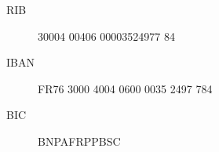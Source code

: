 

\begin{description}
\item[RIB] 30004 00406 00003524977 84
\item[IBAN] FR76 3000 4004 0600 0035 2497 784
\item[BIC] BNPAFRPPBSC
\end{description}
